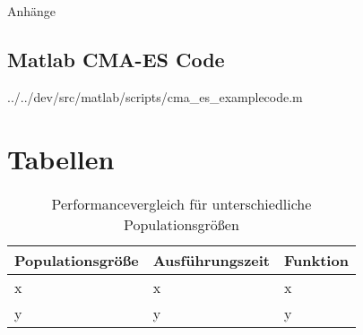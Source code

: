 ﻿%
%
%
%

\begin{appendix}
\newpage
\huge{Anhänge}
\normalsize
\thispagestyle{plain}

\newpage
\begin{landscape}
\thispagestyle{plain}
\section{Matlab CMA-ES Code}
\label{lst:cmaes-mat-code}


		{../../dev/src/matlab/scripts/cma_es_examplecode.m}

\end{landscape}

\newpage
\thispagestyle{plain}
\section{Tabellen}
  \label{tbl:population-compare}

    \begin{table}[h]
      \centering

    \begin{tabular}{lll}
	\hline
	\textbf{Populationsgröße} & \textbf{Ausführungszeit} & \textbf{Funktion}\\\hline
	x & x & x \\
	y & y & y \\

      \end{tabular}
    \caption{Performancevergleich für unterschiedliche Populationsgrößen}
    \end{table}

\end{appendix}
